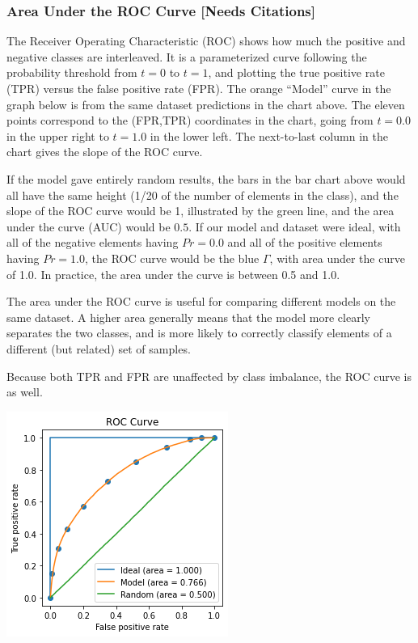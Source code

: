 \subsubsection{Area Under the ROC Curve [Needs Citations]}

The Receiver Operating Characteristic (ROC) shows how much the positive and negative classes are interleaved.  It is a parameterized curve following the probability threshold from $t=0$ to $t=1$, and plotting the true positive rate (TPR) versus the false positive rate (FPR).  The orange ``Model''  curve in the graph below is from the same dataset predictions in the chart above.  The eleven points correspond to the (FPR,TPR) coordinates in the chart, going from $t=0.0$ in the upper right to $t=1.0$ in the lower left.    The next-to-last column in the chart gives the slope of the ROC curve.  

If the model gave entirely random results, the bars in the bar chart above would all have the same height (1/20 of the number of elements in the class), and the slope of the ROC curve would be 1, illustrated by the green line, and the area under the curve (AUC) would be $0.5$.  If our model and dataset were ideal, with all of the negative elements having $Pr=0.0$ and all of the positive elements having $Pr=1.0$, the ROC curve would be the blue $\Gamma$, with area under the curve of 1.0.  In practice, the area under the curve is between 0.5 and 1.0.  

The area under the ROC curve is useful for comparing different models on the same dataset.  A higher area generally means that the model more clearly separates the two classes, and is more likely to correctly classify elements of a different (but related) set of samples.

Because both TPR and FPR are unaffected by class imbalance, the ROC curve is as well.  



\begin{center}
	\includegraphics[scale=0.8]{ROC_Example.png}
\end{center}
